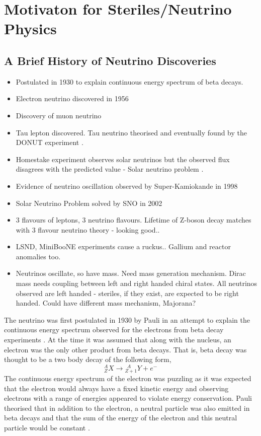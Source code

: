 \chapter{Motivaton for Steriles/Neutrino Physics}
\label{chap:Neutrino Physics}
\section{A Brief History of Neutrino Discoveries}
\begin{itemize}
    \item Postulated in 1930 to explain continuous energy spectrum of beta decays. \cite{Pauli_letter}
    \item Electron neutrino discovered in 1956 \cite{cowan_and_reines_paper}
    \item Discovery of muon neutrino \cite{Muon_neutrino_discovery}
    \item Tau lepton discovered. Tau neutrino theorised and eventually found by the DONUT experiment \cite{DONUT}.
    \item Homestake experiment observes solar neutrinos but the observed flux disagrees with the predicted value - Solar neutrino problem \cite{Homestake}. 
    \item Evidence of neutrino oscillation observed by Super-Kamiokande in 1998 \cite{SuperK_neutrino_oscillations}
    \item Solar Neutrino Problem solved by SNO in 2002 \cite{SNO_solar_neutrinos}
    \item 3 flavours of leptons, 3 neutrino flavours. Lifetime of Z-boson decay matches with 3 flavour neutrino theory - looking good..
    \item LSND, MiniBooNE experiments cause a ruckus.. Gallium and reactor anomalies too.
    \item Neutrinos oscillate, so have mass. Need mass generation mechanism. Dirac mass needs coupling between left and right handed chiral states. All neutrinos observed are left handed - steriles, if they exist, are expected to be right handed. Could have different mass mechanism, Majorana? 
\end{itemize}


The neutrino was first postulated in 1930 by Pauli in an attempt to explain the continuous energy spectrum observed for the electrons from beta decay experiments \cite{Pauli_letter}. At the time it was assumed that along with the nucleus, an electron was the only other product from beta decays. That is, beta decay was thought to be a two body decay of the following form,
\begin{equation}
    {^A_Z}X \longrightarrow {^{\ \ A}_{Z+1}}Y + e^-
\end{equation}
The continuous energy spectrum of the electron was puzzling as it was expected that the electron would always have a fixed kinetic energy and observing electrons with a range of energies appeared to violate energy conservation. Pauli theorised that in addition to the electron, a neutral particle was also emitted in beta decays and that the sum of the energy of the electron and this neutral particle would be constant \cite{Pauli_letter}.

